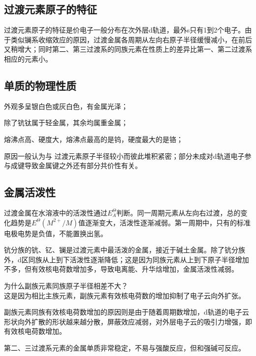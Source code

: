 \documentclass[a4paper,UTF8]{article}
\begin{document}
\subsection{过渡元素原子的特征}

过渡元素原子的特征是价电子一般分布在次外层d轨道，最外s只有1到2个电子。由于类似镧系收缩效应的原因，过渡金属各周期从左向右原子半径缓慢减小，在前后又稍增大；同时第二、第三过渡系的同族元素在性质上的差异比第一、第二过渡系相应的元素小。

\subsection{单质的物理性质}

外观多呈银白色或灰白色，有金属光泽；

除了钪钛属于轻金属，其余均属重金属；

熔沸点高、硬度大，熔沸点最高的是钨，硬度最大的是铬；

原因一般认为与 过渡元素原子半径较小而彼此堆积紧密；部分未成对d轨道电子参与成键导致金属键之外还有部分共价性有关。

\subsection{金属活泼性}

过渡金属在水溶液中的活泼性通过$E_A^\Theta$判断。同一周期元素从左向右过渡，总的变化趋势是$E^\Theta(M^{2+}/M)$值逐渐变大，活泼性逐渐减弱。第一周期中，只有的标准电极电势是负值，不能置换出氢。

钪分族的钪、钇、镧是过渡元素中最活泼的金属，接近于碱土金属。除了钪分族外，d区同族从上到下活泼性逐渐降低；这是因为同族元素从上到下原子半径增加不多，但有效核电荷数增加多，导致电离能、升华焓增加，金属活泼性减弱。

\begin{tcolorbox}
	
	为什么副族元素同族原子半径相差不大？\\

	这是因为相比主族元素，副族元素有效核电荷数的增加抑制了电子云向外扩张。

	副族元素同族有效核电荷数增加的原因则是由于随着周期数增加，d轨道的电子云形状向外扩散的形状越来越分散，屏蔽效应减弱，对外层电子云的吸引力增强，即有效核电荷数增加。

\end{tcolorbox}
	
第二、三过渡系元素的金属单质非常稳定，不易与强酸反应，但和强碱可反应。
\end{document}
